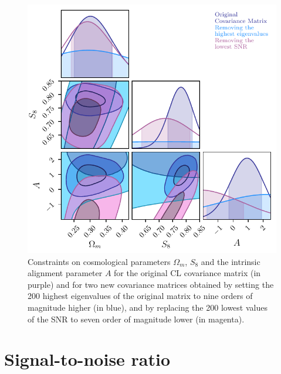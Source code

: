 \documentclass[twocolumn]{\docclass}
\begin{document}
	\begin{figure}
		\includegraphics[width=0.9\columnwidth]{Parameters.pdf}
		\caption{Constraints on cosmological parameters $\Omega_m$, $S_8$ and the intrinsic alignment parameter $A$ for the original CL covariance matrix (in purple) and for two new covariance matrices obtained by setting the 200 highest eigenvalues of the original matrix to nine orders of magnitude higher (in blue), and by replacing the 200 lowest values of the SNR to seven order of magnitude lower (in magenta). \label{fig:eig_snr}}
	\end{figure}
	
	
	\section{Signal-to-noise ratio}
	
\end{document}

